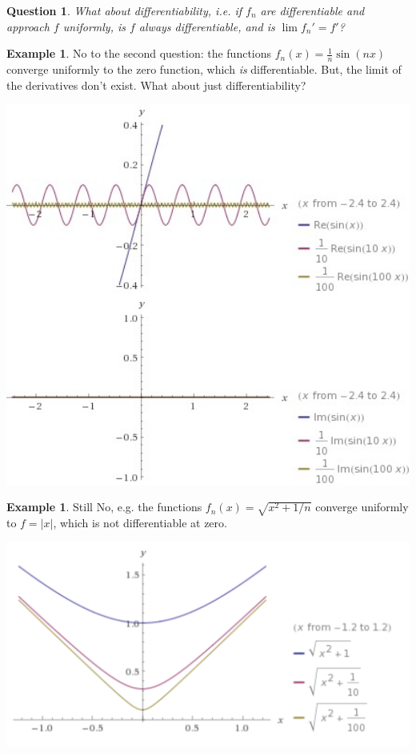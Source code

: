 \documentclass[12pt]{article}
\theoremstyle{plain}
\newtheorem{question}[theorem]{Question}
\theoremstyle{definition}
\newtheorem{example}[theorem]{Example}
\theoremstyle{remark}
\begin{document}
\begin{question}
What about differentiability, i.e. if $f_n$ are differentiable and approach $f$ uniformly, is $f$ always differentiable, and is $\lim f_n' = f'$? 
\end{question}

\begin{example}
No to the second question: the functions $f_n(x) = \frac{1}{n} \sin(nx)$ converge uniformly to the zero function, which \textit{is} differentiable. But, the limit of the derivatives don't exist. What about just differentiability? 
\end{example}

\centerline{\includegraphics[width=1.0\textwidth]{uniformconvergence1}}

\begin{example}
Still No, e.g. the functions $f_n(x) = \sqrt{x^2 + 1/n}$ converge uniformly to $f = |x|$, which is not differentiable at zero.
\end{example}

\centerline{\includegraphics[width=1.0\textwidth]{uniformconvergence2}}
\end{document}
